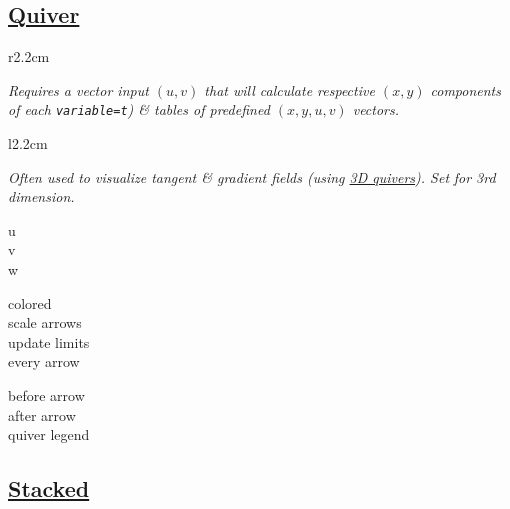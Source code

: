 \subsection*{\href{\docurl\#pgfp./pgfplots/quiver}{Quiver}}


\begin{wrapfigure}[5]{r}{2.2cm}
\vspace{-8mm}
\resizebox{2cm}{!}{}
\end{wrapfigure}

\textit{Requires a vector input $(u,v)$ that will calculate respective $(x,y)$ components of each \texttt{variable=t}\textit{) \& tables of predefined $(x,y,u,v)$ vectors.} }\\

\begin{wrapfigure}[4]{l}{2.2cm}
\vspace{-6mm}
\resizebox{2cm}{!}{}
\end{wrapfigure}

\textit{Often used to visualize tangent \& gradient fields (using \href{\docurl\#pgfp./pgfplots/quiver/w}{3D quivers}). Set }\href{\docurl\#pgfp./pgfplots/quiver/w}{}\textit{ for 3rd dimension.}\\

{\color{blue}
\begin{minipage}[t]{1.0cm}
u\\
v\\
w\\
\end{minipage}
\begin{minipage}[t]{2.5cm}
colored\\
scale arrows\\
update limits\\
every arrow\\
\end{minipage}
\begin{minipage}[t]{2.2cm}
before arrow\\
after arrow\\
quiver legend
\end{minipage}}



\subsection*{\href{\docurl\#pgfp./pgfplots/stack:plots}{Stacked}}

